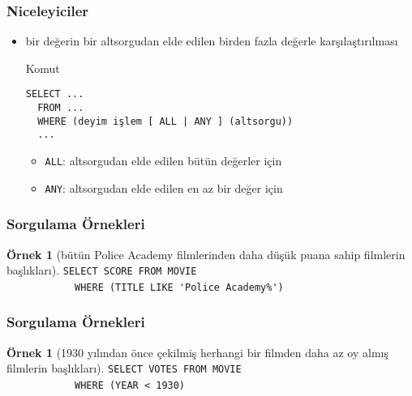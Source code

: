 \documentclass[dvipsnames]{beamer}
\theoremstyle{definition}
\theoremstyle{example}
\newtheorem{ornek}[theorem]{Örnek}
\theoremstyle{plain}
\begin{document}
\begin{frame}[fragile]
  \frametitle{Niceleyiciler}

  \begin{itemize}
    \item bir değerin bir altsorgudan elde edilen birden fazla değerle
      karşılaştırılması

    \begin{block}{Komut}
      \begin{lstlisting}
SELECT ...
  FROM ...
  WHERE (deyim işlem [ ALL | ANY ] (altsorgu))
  ...
      \end{lstlisting}
    \end{block}

    \pause
    \begin{itemize}
      \item \lstinline!ALL!: altsorgudan elde edilen bütün değerler için
      \item \lstinline!ANY!: altsorgudan elde edilen en az bir değer için
    \end{itemize}
  \end{itemize}
\end{frame}

\begin{frame}[fragile]
  \frametitle{Sorgulama Örnekleri}

  \begin{ornek}[bütün Police Academy filmlerinden daha düşük puana sahip
                filmlerin başlıkları]
\lstinline!SELECT SCORE FROM MOVIE!\\
~~~~~~~~~~~~\lstinline!WHERE (TITLE LIKE 'Police Academy%')!
  \end{ornek}
\end{frame}

\begin{frame}[fragile]
  \frametitle{Sorgulama Örnekleri}

  \begin{ornek}[1930 yılından önce çekilmiş herhangi bir filmden daha az oy
                almış filmlerin başlıkları]
\lstinline!SELECT VOTES FROM MOVIE!\\
~~~~~~~~~~~~\lstinline!WHERE (YEAR < 1930)!
  \end{ornek}
\end{frame}
\end{document}
